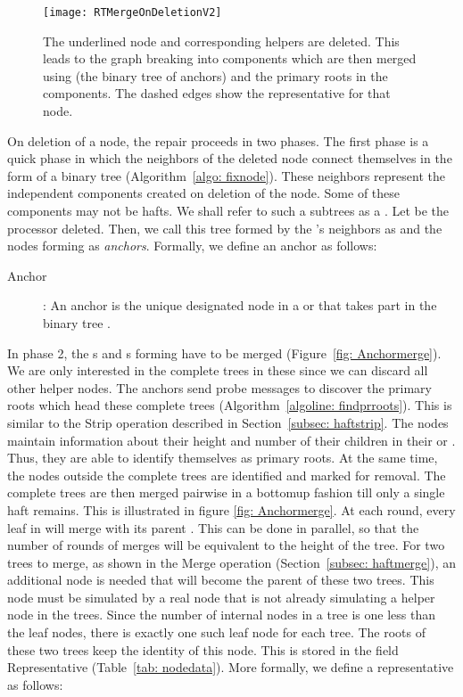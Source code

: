 \documentclass[11pt, letter]{article}
\begin{document}
\begin{figure}[h!]
\centering
\texttt{[image: RTMergeOnDeletionV2]}
\caption{The underlined node  and corresponding helpers are deleted. This leads to the graph breaking into
components which are then merged using  (the binary tree of anchors) and the primary roots in the components. The dashed edges
show the representative for that node.}
\label{fig: RTmerge}
\end{figure}




On deletion of a node, the repair proceeds in two phases. The first phase is a quick  phase in which the neighbors
of the deleted node connect themselves in the form of a binary tree (Algorithm~\ref{algo: fixnode}). These neighbors represent the
independent components created on deletion of the node. Some of these components may not be hafts. We shall refer to
such a subtrees as a . Let  be the processor deleted. Then, we call this tree formed by the 's
neighbors as  and the nodes forming  as \emph{anchors}. Formally, we define an anchor as follows:
\begin{description}
\item[Anchor]: An anchor is the unique designated node in a  or  that takes part in the binary
tree .
\end{description}
 In phase 2,  the s and s forming  have to be merged (Figure~\ref{fig: Anchormerge}). We are only interested in
the complete trees in these since we can discard all other helper nodes. The anchors send probe messages to discover
the primary roots which head these complete trees (Algorithm~\ref{algoline: findprroots}). This is similar to the Strip
operation described in Section~{\ref{subsec: haftstrip}}. The
nodes maintain information about their height and number of their children in their  or . Thus,
they are able to identify themselves as primary roots. At the same time, the nodes outside the complete trees are
identified and marked for removal. The complete trees are then merged pairwise in a bottomup fashion till only a single
haft remains. This is
illustrated in figure \ref{fig: Anchormerge}. At each round, every leaf  in  will merge with its parent
. This can be done in parallel, so that the  number of rounds of merges will be equivalent to the height of the
tree. For two trees to merge, as shown in the Merge operation (Section~\ref{subsec: haftmerge}), an additional node is
needed that will become the parent of these two trees. This node must be simulated by a real node that is not already
simulating a helper node in the trees. Since the number of internal  nodes in a tree is one less than the leaf nodes,
there is exactly one such leaf node for each tree. The roots of these two trees keep the identity of this node. This is
stored in the field Representative (Table~\ref{tab: nodedata}). More  formally, we define a representative as follows:
\end{document}
